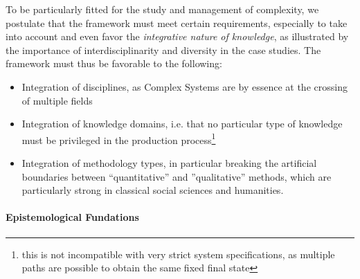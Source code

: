 \documentclass[runningheads,a4paper]{llncs2e/llncs}
\begin{document}
To be particularly fitted for the study and management of complexity, we postulate that the framework must meet certain requirements, especially to take into account and even favor the \emph{integrative nature of knowledge}, as illustrated by the importance of interdisciplinarity and diversity in the case studies. The framework must thus be favorable to the following:
\begin{itemize}
\item Integration of disciplines, as Complex Systems are by essence at the crossing of multiple fields
\item Integration of knowledge domains, i.e. that no particular type of knowledge must be privileged in the production process\footnote{this is not incompatible with very strict system specifications, as multiple paths are possible to obtain the same fixed final state}
\item Integration of methodology types, in particular breaking the artificial boundaries between ``quantitative'' and ''qualitative'' methods, which are particularly strong in classical social sciences and humanities.
\end{itemize}




\paragraph{Epistemological Fundations}
\end{document}
